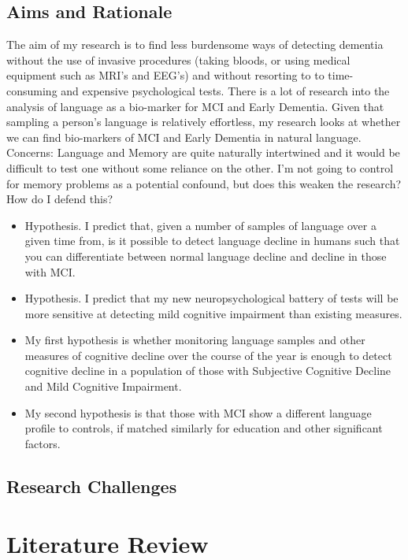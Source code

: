 \documentclass{article}
\begin{document}
\subsection{Aims and Rationale}
The aim of my research is to find less burdensome ways of detecting dementia without the use of invasive procedures (taking bloods, or using medical equipment such as MRI's and EEG's) and without resorting to to time-consuming and expensive psychological tests. There is a lot of research into the analysis of language as a bio-marker for MCI and Early Dementia. Given that sampling a person's language is relatively effortless, my research looks at whether we can find bio-markers of MCI and Early Dementia in natural language.\newline
Concerns: Language and Memory are quite naturally intertwined and it would be difficult to test one without some reliance on the other. I'm not going to control for memory problems as a potential confound, but does this weaken the research? How do I defend this? \newline
\begin{itemize}
	\item Hypothesis. I predict that, given a number of samples of language over a given time from, is it possible to detect language decline in humans such that you can differentiate between normal language decline and decline in those with MCI.
	\item Hypothesis. I predict that my new neuropsychological battery of tests will be more sensitive at detecting mild cognitive impairment than existing measures.
	\item My first hypothesis is whether monitoring language samples and other measures of cognitive decline over the course of the year is enough to detect cognitive decline in a population of those with Subjective Cognitive Decline and Mild Cognitive Impairment.
	\item My second hypothesis is that those with MCI show a different language profile to controls, if matched similarly for education and other significant factors.
\end{itemize}

\subsection{Research Challenges}
\section{Literature Review}
\end{document}
